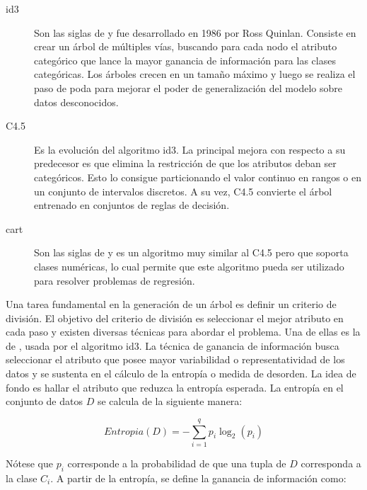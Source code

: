 \begin{description} 

   \item[\acrshort{id3}] Son las siglas de  y
      fue desarrollado en 1986 por Ross Quinlan. Consiste en crear un árbol de
      múltiples vías, buscando para cada nodo el atributo categórico que lance
      la mayor ganancia de información para las clases categóricas. Los árboles
      crecen en un tamaño máximo y luego se realiza el paso de poda para mejorar
      el poder de generalización del modelo sobre datos desconocidos.

   \item[C4.5] Es la evolución del algoritmo \acrshort{id3}. La principal mejora
      con respecto a su predecesor es que elimina la restricción de que los
      atributos deban ser categóricos. Esto lo consigue particionando el valor
      continuo en rangos o en un conjunto de intervalos discretos. A su vez,
      C4.5 convierte el árbol entrenado en conjuntos de reglas de decisión. 

   \item[\acrshort{cart}] Son las siglas de  y
      es un algoritmo muy similar al C4.5 pero que soporta clases numéricas, lo
      cual permite que este algoritmo pueda ser utilizado para resolver
      problemas de regresión. 

\end{description}

Una tarea fundamental en la generación de un árbol es definir un criterio de
división. El objetivo del criterio de división es seleccionar el mejor atributo
en cada paso y existen diversas técnicas para abordar el problema. Una de ellas
es la de , usada por el algoritmo
\acrshort{id3}. La técnica de ganancia de información busca seleccionar el
atributo que posee mayor variabilidad o representatividad de los datos y se
sustenta en el cálculo de la entropía o medida de desorden. La idea de fondo es
hallar el atributo que reduzca la entropía esperada. La entropía en el conjunto
de datos $D$ se calcula de la siguiente manera:

\begin{equation}
   Entropia(D) = - \sum_{i=1}^{q} p_{i}\log_{2}(p_{i})
\end{equation}

Nótese que $p_{i}$ corresponde a la probabilidad de que una tupla de $D$
corresponda a la clase $C_{i}$.  A partir de la entropía, se define la ganancia
de información como:

